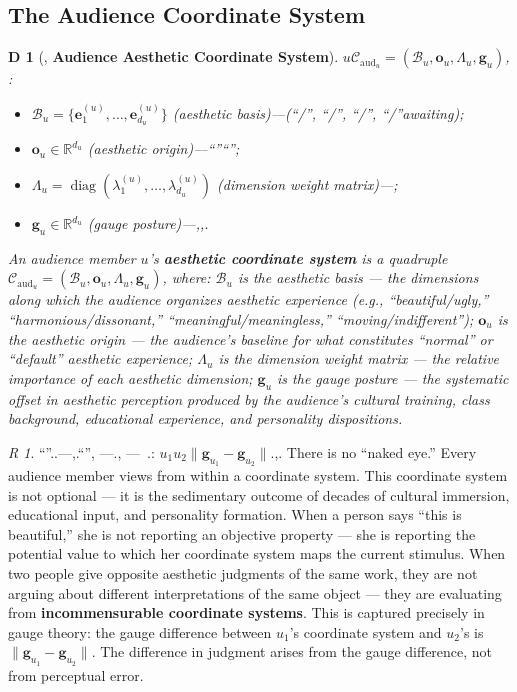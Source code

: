\documentclass[12pt,a4paper]{article}
\newtheorem{definition}[theorem]Definition
\theoremstyle{remark}
\newtheorem{remark}[theorem]Remark
\DeclareMathOperator{\diag}{diag}
\newcommand{\R}{\mathbb{R}}
\newcommand{\norm}[1]{\|#1\|}
\newcommand{\AudCoord}{\mathcal{C}_{\text{aud}}}
\newcommand{\GParam}{\mathbf{g}}
\begin{document}
\subsection{The Audience Coordinate System}
\begin{definition}[, \textbf{Audience Aesthetic Coordinate System}]
\label{def:audience_coords}
$u$$\AudCoord_u = (\mathcal{B}_u, \mathbf{o}_u, \Lambda_u, \GParam_u)$, : 
\begin{itemize}
 \item $\mathcal{B}_u = \{\mathbf{e}_1^{(u)}, \dots, \mathbf{e}_{d_u}^{(u)}\}$ (aesthetic basis)---(``/'', ``/'', ``/'', ``/''awaiting); 
 \item $\mathbf{o}_u \in \R^{d_u}$ (aesthetic origin)---``''``''; 
 \item $\Lambda_u = \diag(\lambda_1^{(u)}, \dots, \lambda_{d_u}^{(u)})$ (dimension weight matrix)---; 
 \item $\GParam_u \in \R^{d_u}$ (gauge posture)---,,.
\end{itemize}
An audience member $u$'s \textbf{aesthetic coordinate system} is a quadruple $\AudCoord_u = (\mathcal{B}_u, \mathbf{o}_u, \Lambda_u, \GParam_u)$, where: $\mathcal{B}_u$ is the aesthetic basis --- the dimensions along which the audience organizes aesthetic experience (e.g., ``beautiful/ugly,'' ``harmonious/dissonant,'' ``meaningful/meaningless,'' ``moving/indifferent''); $\mathbf{o}_u$ is the aesthetic origin --- the audience's baseline for what constitutes ``normal'' or ``default'' aesthetic experience; $\Lambda_u$ is the dimension weight matrix --- the relative importance of each aesthetic dimension; $\GParam_u$ is the gauge posture --- the systematic offset in aesthetic perception produced by the audience's cultural training, class background, educational experience, and personality dispositions.
\end{definition}
\begin{remark}
``''..---,.``'', ---., ---\ .: $u_1$$u_2$$\norm{\GParam_{u_1} - \GParam_{u_2}}$.,.
There is no ``naked eye.'' Every audience member views from within a coordinate system. This coordinate system is not optional --- it is the sedimentary outcome of decades of cultural immersion, educational input, and personality formation. When a person says ``this is beautiful,'' she is not reporting an objective property --- she is reporting the potential value to which her coordinate system maps the current stimulus. When two people give opposite aesthetic judgments of the same work, they are not arguing about different interpretations of the same object --- they are evaluating from \textbf{incommensurable coordinate systems}. This is captured precisely in gauge theory: the gauge difference between $u_1$'s coordinate system and $u_2$'s is $\norm{\GParam_{u_1} - \GParam_{u_2}}$. The difference in judgment arises from the gauge difference, not from perceptual error.
\end{remark}
\end{document}
